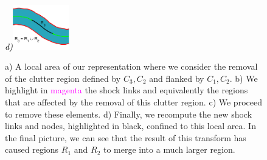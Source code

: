 \begin{figure}[!ht]
{\footnotesize\textit{\textcolor{black}{d)}}}\includegraphics[width=0.22\textwidth]{figs/rr_l8.pdf}
\caption{a) A local area of our representation where we consider the removal of the clutter region defined by $C_3,C_2$ and flanked by $C_1,C_2$. b) We highlight in \textcolor{magenta}{magenta} the shock links and equivalently the regions that are affected by the removal of this clutter region. c) We proceed to remove these elements. d) Finally, we recompute the new shock links and nodes, highlighted in black, confined to this local area. In the final picture, we can see that the result of this transform has caused regions $R_1$ and $R_2$ to merge into a much larger region.}
\label{fig:rc_steps}
\end{figure}

